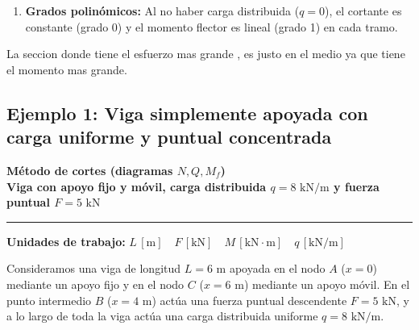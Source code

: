 {\begin{enumerate}
\begin{itemize}
                        \[
                            \Delta Q = Q(2^+) - Q(2^-) = -5 - (+5) = -10\text{ kN} = -F
                        \]
                  \item Al no existir momentos puntuales aplicados, la ley de $M_f(x)$ es continua en $x = 2\text{ m}$ ($M_f(2) = 10\text{ kN}\cdot\text{m}$), con un punto anguloso debido al salto de cortante.
              \end{itemize}
        \item \textbf{Grados polinómicos:} Al no haber carga distribuida ($q = 0$), el cortante es constante (grado 0) y el momento flector es lineal (grado 1) en cada tramo.
    \end{enumerate}
}

La seccion donde tiene el esfuerzo mas grande , es justo en el medio ya que tiene el momento mas grande.


\subsection{Ejemplo 1: Viga simplemente apoyada con carga uniforme y puntual concentrada}

\begin{tcolorbox}[colback=blue!3!white, colframe=blue!40!black, arc=3pt, boxrule=0.8pt, left=8pt, right=8pt, top=6pt, bottom=6pt]
    \centering
    {\Large\bfseries\color{blue!60!black} Método de cortes (diagramas $N, Q, M_f$)}\\[2pt]
    {\normalsize\bfseries Viga con apoyo fijo y móvil, carga distribuida $q = 8\text{ kN/m}$ y fuerza puntual $F = 5\text{ kN}$}

    \vspace{4pt}\hrule\vspace{4pt}
    {\small\textbf{Unidades de trabajo:} $L\,[\text{m}] \quad F\,[\text{kN}] \quad M\,[\text{kN}\cdot\text{m}] \quad q\,[\text{kN/m}]$}
\end{tcolorbox}


Consideramos una viga de longitud $L = 6\text{ m}$ apoyada en el nodo $A$ ($x=0$) mediante un apoyo fijo y en el nodo $C$ ($x=6\text{ m}$) mediante un apoyo móvil. En el punto intermedio $B$ ($x=4\text{ m}$) actúa una fuerza puntual descendente $F = 5\text{ kN}$, y a lo largo de toda la viga actúa una carga distribuida uniforme $q = 8\text{ kN/m}$.

